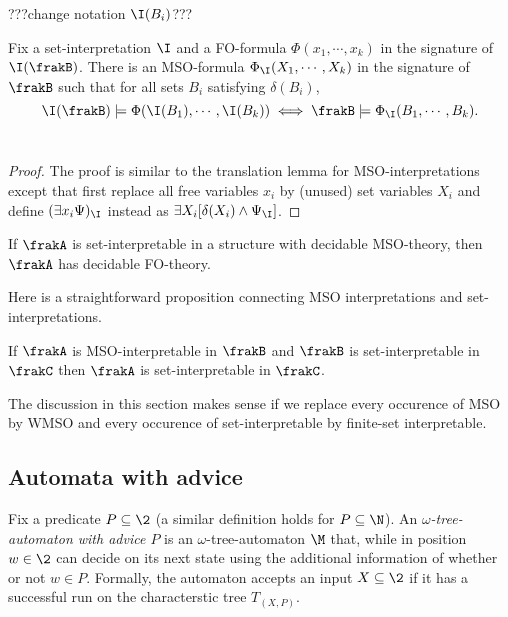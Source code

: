 ???change notation $\I(B_i)$???
\begin{lemma}
Fix a set-interpretation $\I$ and a FO-formula $\Phi(x_1,\cdots,x_k)$ in the signature of $\I(\frakB)$.
There is an MSO-formula $\Phi_\I(X_1,\cdots,X_k)$ in the signature of $\frakB$ such that for all sets $B_i$ satisfying $\delta(B_i)$,
\[
\I(\frakB) \models \Phi(\I(B_1),\cdots,\I(B_k))  \iff 
\frakB \models \Phi_\I(B_1,\cdots,B_k). 
\]
\
\end{lemma}

\begin{proof}
The proof is similar to the translation lemma for MSO-interpretations except that first replace all free variables $x_i$ by (unused) 
set variables $X_i$ and define $(\exists x_i \Psi)_\I$ instead as
$\exists X_i [ \delta(X_i) \wedge \Psi_\I]$.
\end{proof}

\begin{proposition}
If $\frakA$ is set-interpretable in a structure with decidable MSO-theory, then $\frakA$ has decidable FO-theory.
\end{proposition}


Here is a straightforward proposition connecting MSO interpretations and set-interpretations.

\begin{lemma}
If $\frakA$ is MSO-interpretable in $\frakB$ and $\frakB$ is set-interpretable
in $\frakC$ then $\frakA$ is set-interpretable in $\frakC$.  
\end{lemma}

The discussion in this section makes sense if we replace every occurence of MSO
by WMSO and every occurence of set-interpretable by finite-set interpretable.

\subsection{Automata with advice}
Fix a predicate $P \subseteq \2$ (a similar definition holds for $P \subseteq \N$).
An {\em $\omega$-tree-automaton with advice $P$} is an $\omega$-tree-automaton $\M$ that, while in
position $w \in \2$ can decide on its next state using the additional
information of whether or not $w \in P$. Formally, the automaton accepts an
input $X \subseteq \2$ if it has a successful run on the characterstic tree $T_{(X,P)}$.


\fi
